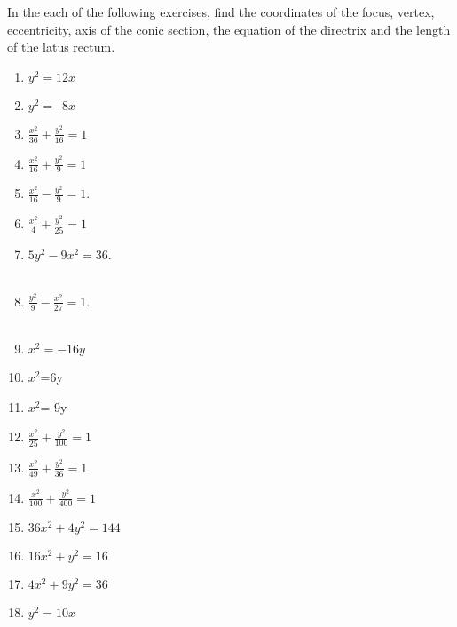 In the each of the following exercises, find the coordinates of the focus, vertex, eccentricity, axis of the conic section, the equation of the directrix and the length of the latus rectum.
\begin{enumerate}[label=\thesubsection.\arabic*,ref=\thesubsection.\theenumi]
\item $y^2=12x$ 
\label{chapters/11/11/2/1}
\\
\solution

\item 
$y^2 = –8x$
\\
\solution

  \item $\frac{x^2}{36}+\frac{y^2}{16}=1$
\\
\solution

  \item $\frac{x^2}{16}+\frac{y^2}{9}=1$
\\
\solution

	\item $\frac{x^2}{16}-\frac{y^2}{9} = 1$. \\ 
		\solution
		
\begin{table}[!ht]
\centering
\caption{}
\label{tab:std-conic-params-sol}
\resizebox{\columnwidth}{!}{%
		
		}
\end{table}
  \item $\frac{x^2}{4}+\frac{y^2}{25}=1$
\\
\solution

	\item $5{y^2}-9{x^2}=36$.
		\\
		\solution
		\\
		
	\item $\frac{y^2}{9}-\frac{x^2}{27}=1$.
		\\
		\solution
		\\
		
\item $x^2=-16y$
\\
\solution

\item $x^2$=6y 
\\
\solution

\begin{table}[!ht]
\centering
\caption{}
\label{tab:rot-conic-params-sol}
\resizebox{\columnwidth}{!}{%
		
		}
\end{table}
\item $x^2$=-9y  
  \item $\frac{x^2}{25}+\frac{y^2}{100}=1$
  \item $\frac{x^2}{49}+\frac{y^2}{36}=1$
  \item $\frac{x^2}{100}+\frac{y^2}{400}=1$
  \item $36x^2+4y^2=144$
  \item $16x^2+y^2=16$
  \item $4x^2+9y^2=36$
\item $y^2=10x$  
\end{enumerate}

